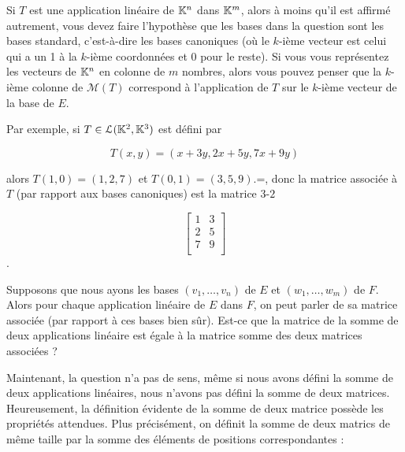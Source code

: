 \documentclass[12pt]{book}
\begin{document}
Si $T$ est une application linéaire de $\mathbb{K}^n$ dans $\mathbb{K}^m$, alors à moins qu'il est affirmé autrement, vous devez faire l'hypothèse que les bases dans la question sont les bases standard, c'est-à-dire les bases canoniques (où le $k$-ième vecteur est celui qui a un 1 à la $k$-ième coordonnées et 0 pour le reste). Si vous vous représentez les vecteurs de $\mathbb{K}^n$ en colonne de $m$ nombres, alors vous pouvez penser que la $k$-ième colonne de $\mathcal{M}(T)$ correspond à l'application de $T$ sur le $k$-ième vecteur de la base de $E$.

\noindent
Par exemple, si $T\in\mathcal{L}(\mathbb{K}^2,\mathbb{K}^3)$ est défini par 

\begin{equation*}
    T(x,y)=(x+3y,2x+5y,7x+9y)
\end{equation*}

\noindent
alors $T(1,0)=(1,2,7)$ et $T(0,1)=(3,5,9)$.=, donc la matrice associée à $T$ (par rapport aux bases canoniques) est la matrice $3$-$2$
\begin{center}
    \begin{equation*}\begin{bmatrix}
        1 & 3 \\
        2 & 5 \\
        7 & 9 \\
    \end{bmatrix}\end{equation*}.
\end{center}

Supposons que nous ayons les bases $(v_1,\ldots,v_n)$ de $E$ et $(w_1,\ldots,w_m)$ de $F$. Alors pour chaque application linéaire de $E$ dans $F$, on peut parler de sa matrice associée (par rapport à ces bases bien sûr). Est-ce que la matrice de la somme de deux applications linéaire est égale à la matrice somme des deux matrices associées ?

Maintenant, la question n'a pas de sens, même si nous avons défini la somme de deux applications linéaires, nous n'avons pas défini la somme de deux matrices. Heureusement, la définition évidente de la somme de deux matrice possède les propriétés attendues. Plus précisément, on définit la somme de deux matrics de même taille par la somme des éléments de positions correspondantes :
\end{document}
